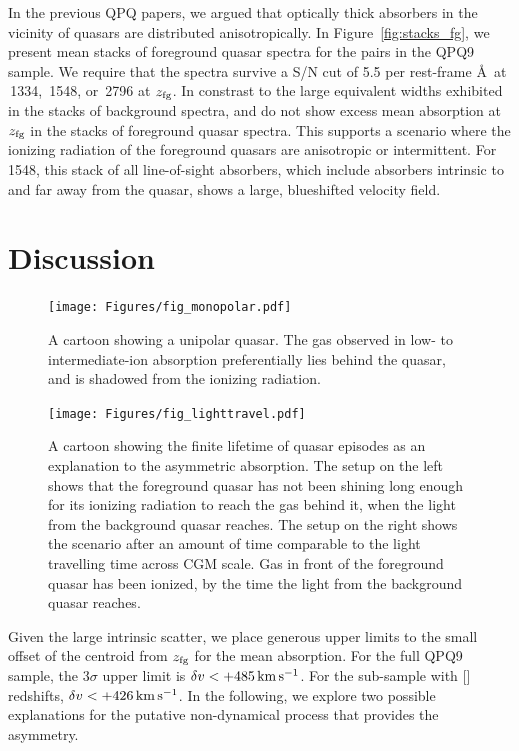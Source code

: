 \documentclass[iop]{emulateapj}
\begin{document}
In the previous QPQ papers, we argued that optically thick absorbers in the vicinity of quasars 
are distributed anisotropically. In Figure~\ref{fig:stacks_fg}, we present mean stacks of 
foreground quasar spectra for the pairs in the QPQ9 sample. We require that the spectra survive a 
S/N cut of 5.5 per rest-frame \AA\ at \,1334, \,1548, or \,2796 at 
$z_{\rm fg}$. In constrast to the large equivalent widths exhibited in the stacks of background 
spectra,  and  do not show excess mean absorption at $z_{\rm fg}$ in the 
stacks of foreground quasar spectra. This supports a scenario where the ionizing radiation of the 
foreground quasars are anisotropic or intermittent. For \,1548, this stack of all 
line-of-sight absorbers, which include absorbers intrinsic to and far away from the quasar, shows 
a large, blueshifted velocity field. 

\section{Discussion}
\label{sec:discussion}

\begin{figure}[!h]
\begin{minipage}[!bp]{0.28\textwidth}
\texttt{[image: Figures/fig\_monopolar.pdf]}
\caption{A cartoon showing a unipolar quasar. The gas observed in low- to intermediate-ion 
absorption preferentially lies behind the quasar, and is shadowed from the ionizing radiation. 
}
\label{fig:monopolar}
\end{minipage}%
\hspace{0.3in}
\begin{minipage}[!bp]{0.67\textwidth}
\texttt{[image: Figures/fig\_lighttravel.pdf]}
\caption{A cartoon showing the finite lifetime of quasar episodes as an explanation to the 
asymmetric absorption. The setup on the left shows that the foreground quasar has not been shining 
long enough for its ionizing radiation to reach the gas behind it, when the light from the 
background quasar reaches. The setup on the right shows the scenario after an amount of time 
comparable to the light travelling time across CGM scale. Gas in front of the foreground quasar 
has been ionized, by the time the light from the background quasar reaches. 
}
\label{fig:lighttravel}
\end{minipage}
\end{figure}

Given the large intrinsic scatter, we place generous upper limits to the small offset of the 
centroid from $z_{\rm fg}$ for the  mean absorption. For the full QPQ9 sample, the 
$3\sigma$ upper limit is $\delta v<+485\,{\rm km\,s^{-1}}$. For the sub-sample with [] 
redshifts, $\delta v<+426\,{\rm km\,s^{-1}}$. In the following, we explore two possible 
explanations for the putative non-dynamical process that provides the asymmetry. 
\end{document}
